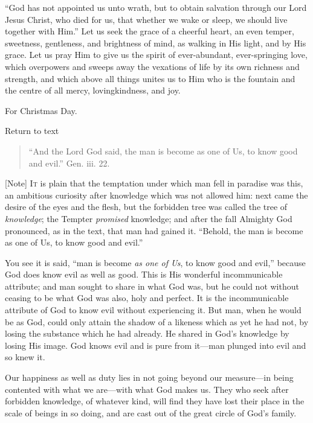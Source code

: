 ``God has not appointed us unto wrath, but to obtain salvation
through our Lord Jesus Christ, who died for us, that whether we wake
or sleep, we should live together with Him.'' Let us seek the
grace of a cheerful heart, an even temper, sweetness, gentleness, and
brightness of mind, as walking in His light, and by His grace. Let us
pray Him to give us the spirit of ever-abundant, ever-springing love,
which overpowers and sweeps away the vexations of life by its own
richness and strength, and which above all things unites us to Him who
is the fountain and the centre of all mercy, lovingkindness, and joy.


For Christmas Day.

Return to text


\begin{quote}

``And the Lord God said, the man is become as one of Us, to
know good and evil.'' Gen. iii. 22.

\end{quote}

[Note] I\textsc{t} is plain that the temptation under which man fell in paradise
was this, an ambitious curiosity after knowledge which was not allowed
him: next came the desire of the eyes and the flesh, but the forbidden
tree was called the tree of \emph{knowledge}; the Tempter \emph{promised}
knowledge; and after the fall Almighty God pronounced, as in the text,
that man had gained it. ``Behold, the man is become as one of Us,
to know good and evil.''

You see it is said, ``man is become \emph{as one of Us}, to
know good and evil,'' because God does know evil as well as good.
This is His wonderful incommunicable attribute; and man sought to
share in what God was, but he could not without ceasing to be what God
was also, holy and perfect. It is the incommunicable attribute of God
to know evil without experiencing it. But man, when he would be as
God, could only attain the shadow of a likeness which as yet he had
not, by losing the substance which he had already. He shared in God's
knowledge by losing His image. God knows evil and is pure from it—man
plunged into evil and so knew it.

Our happiness as well as duty lies in not going beyond our measure—in
being contented with what we are—with what God makes us. They who
seek after forbidden knowledge, of whatever kind, will find they have
lost their place in the scale of beings in so doing, and are cast out
of the great circle of God's family.

